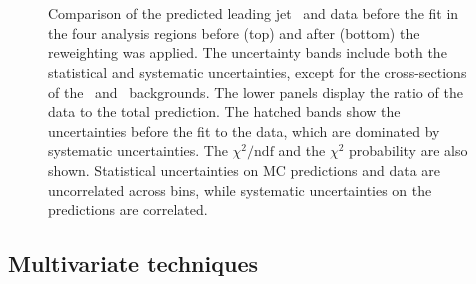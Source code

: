 \begin{figure}[htb]
    \RawFloats
    \begin{center}
       \\
      \\  
    \caption{Comparison of the predicted leading jet \pT\ and data before the fit in the four analysis regions before (top) and after (bottom) the reweighting was applied. The uncertainty bands include both the statistical and systematic uncertainties, except for the cross-sections of the \ttb\ and \ttc\ backgrounds.
    The lower panels display the ratio of the data to the total prediction. 
    The hatched bands show the uncertainties before the fit to the data,  which are dominated by systematic uncertainties. The $\chi^2/\mathrm{ndf}$ and the $\chi^2$ probability are also shown. Statistical uncertainties on MC predictions and data are uncorrelated across bins, while systematic uncertainties on the predictions are correlated.}
    \label{Hplustb:RWeffect}
\end{center}
\end{figure}

\subsection{Multivariate techniques}

